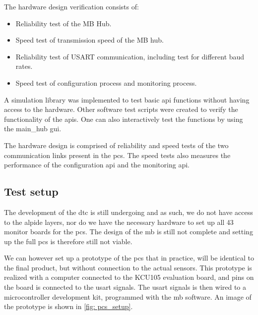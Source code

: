 \documentclass[main.tex]{subfiles}
\begin{document}
The hardware design verification consists of:

\begin{itemize}
    \item Reliability test of the MB Hub.
    \item Speed test of transmission speed of the MB hub.
    \item Reliability test of USART communication, including test for different baud rates.
    \item Speed test of configuration process and monitoring process.
\end{itemize}

A simulation library was implemented to test basic \gls{api} functions without having access to the hardware. Other software test scripts were created to verify the functionality of the \gls{api}s. One can also interactively test the functions by using the main\_hub \gls{gui}. 

The hardware design is comprised of reliability and speed tests of the two communication links present in the \gls{pcs}. The speed tests also measures the performance of the configuration \gls{api} and the monitoring \gls{api}.



\subsection{Test setup}
\label{ssec: test_setup}

The development of the \gls{dtc} is still undergoing and as such, we do not have access to the \gls{alpide} layers, nor do we have the necessary hardware to set up all 43 monitor boards for the \gls{pcs}. The design of the \gls{mb} is still not complete and setting up the full \gls{pcs} is therefore still not viable.

We can however set up a prototype of the \gls{pcs} that in practice, will be identical to the final product, but without connection to the actual sensors. This prototype is realized with a computer connected to the KCU105 evaluation board, and pins on the board is connected to the \gls{usart} signals. The \gls{usart} signals is then wired to a microcontroller development kit, programmed with the \gls{mb} software. An image of the prototype is shown in \autoref{fig: pcs_setup}.
\end{document}
